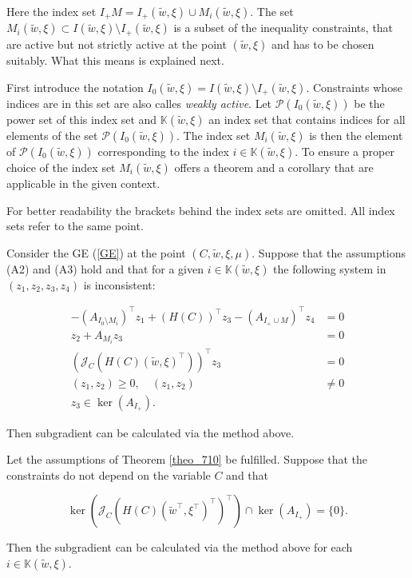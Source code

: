 Here the index set \(I_+M = I_+(\tilde{w},\xi) \cup M_i(\tilde{w},\xi)\).
The set \(M_i(\tilde{w},\xi) \subset I(\tilde{w},\xi) \setminus I_+(\tilde{w},\xi)\) is a subset of the inequality constraints, that are active but not strictly active at the point \((\tilde{w},\xi)\) and has to be chosen suitably.
What this means is explained next.

First introduce the notation \(I_0(\tilde{w},\xi) = I(\tilde{w},\xi) \setminus I_+(\tilde{w},\xi)\). Constraints whose indices are in this set are also calles \emph{weakly active}. Let \(\mathcal{P}(I_0(\tilde{w},\xi))\) be the power set of this index set and \(\mathbb{K}(\tilde{w},\xi)\) an index set that contains indices for all elements of the set \(\mathcal{P}(I_0(\tilde{w},\xi))\). The index set \(M_i(\tilde{w},\xi)\) is then the element of \(\mathcal{P}(I_0(\tilde{w},\xi))\) corresponding to the index \(i \in \mathbb{K}(\tilde{w},\xi)\).
To ensure a proper choice of the index set \(M_i(\tilde{w},\xi)\) \cite{Outrata1998} offers a theorem and a corollary that are applicable in the given context.

For better readability the brackets behind the index sets are omitted. All index sets refer to the same point.

\begin{theorem}
	\label{theo_710}
	Consider the GE (\ref{GE}) at the point \((C,\tilde{w},\xi,\mu)\). Suppose that the assumptions (A2) and (A3) hold and that for a given \(i\in \mathbb{K}(\tilde{w},\xi)\) the following system in \((z_1,z_2,z_3,z_4)\) is inconsistent:
	
	\begin{align*}
		-(A_{I_0 \setminus M_i})^{\top}z_1+(H(C))^{\top}z_3-(A_{I_+\cup M})^{\top}z_4 &= 0 \\
		z_2+A_{M_i}z_3 &= 0\\
		\left(\mathcal{J}_C\left(H(C)(\tilde{w},\xi)^{\top}\right)\right)^{\top}z_3 &= 0 \\	
		(z_1,z_2) \geq 0, \quad (z_1,z_2) &\neq 0 \\
		z_3 \in \ker(A_{I_+}).
	\end{align*}
	
	Then subgradient can be calculated via the method above.
\end{theorem}

\begin{corollary}
	Let the assumptions of Theorem \ref{theo_710} be fulfilled. Suppose that the constraints do not depend on the variable \(C\) and that 
	
	\[  \ker\left(\mathcal{J}_C\left(H(C)(\tilde{w}^{\top},\xi^{\top})^{\top}\right)^{\top}\right) \cap \ker\left(A_{I_+}\right) = \{0\} .\]
	
	Then the subgradient can be calculated via the method above for each \(i \in \mathbb{K}(\tilde{w},\xi)\).
\end{corollary}

